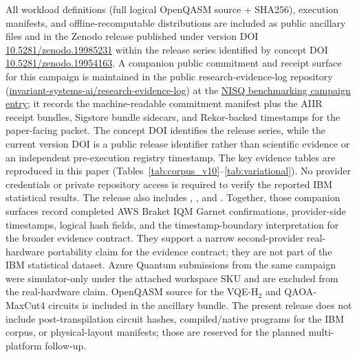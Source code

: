 \documentclass[aps,prxquantum,twocolumn,superscriptaddress,amsmath,amssymb,longbibliography,floatfix]{revtex4-2}
\begin{document}
All workload definitions (full logical OpenQASM source + SHA256), execution manifests, and offline-recomputable distributions are included as public ancillary files and in the Zenodo release published under version DOI \href{https://doi.org/10.5281/zenodo.19985231}{10.5281/zenodo.19985231} within the release series identified by concept DOI \href{https://doi.org/10.5281/zenodo.19954163}{10.5281/zenodo.19954163}. A companion public commitment and receipt surface for this campaign is maintained in the public research-evidence-log repository (\href{https://github.com/invariant-systems-ai/research-evidence-log}{invariant-systems-ai/research-evidence-log}) at the \href{https://github.com/invariant-systems-ai/research-evidence-log/tree/main/commitments/nisq-benchmarking-evidence-2026-05-02}{NISQ benchmarking campaign entry}; it records the machine-readable commitment manifest plus the AIIR receipt bundles, Sigstore bundle sidecars, and Rekor-backed timestamps for the paper-facing packet. The concept DOI identifies the release series, while the current version DOI is a public release identifier rather than scientific evidence or an independent pre-execution registry timestamp. The key evidence tables are reproduced in this paper (Tables~\ref{tab:corpus_v10}--\ref{tab:variational}). No provider credentials or private repository access is required to verify the reported IBM statistical results. The release also includes , , and . Together, those companion surfaces record completed AWS Braket IQM Garnet confirmations, provider-side timestamps, logical hash fields, and the timestamp-boundary interpretation for the broader evidence contract. They support a narrow second-provider real-hardware portability claim for the evidence contract; they are not part of the IBM statistical dataset. Azure Quantum submissions from the same campaign were simulator-only under the attached workspace SKU and are excluded from the real-hardware claim. OpenQASM source for the VQE-H$_2$ and QAOA-MaxCut4 circuits is included in the ancillary bundle. The present release does not include post-transpilation circuit hashes, compiled/native programs for the IBM corpus, or physical-layout manifests; those are reserved for the planned multi-platform follow-up.
\end{document}
